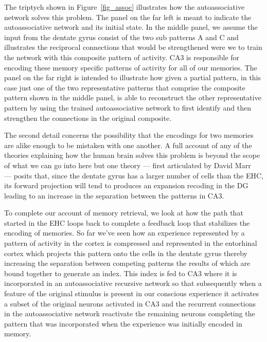 \documentclass[letterpaper,11pt]{article}
\def\urlh#1{{}}
\def\emdash{---}
\begin{document}

The triptych shown in Figure~{\urlh{#fig_Hippocampus_Auto_Associative_Network}{\ref{fig_assoc}}} illustrates how the autoassociative network solves this problem. The panel on the far left is meant to indicate the autoassociative network and its initial state. In the middle panel, we assume the input from the dentate gyrus consist of the two sub patterns A and C and illustrates the reciprocal connections that would be strengthened were we to train the network with this composite pattern of activity. CA3 is responsible for encoding these memory specific patterns of activity for all of our memories.  The panel on the far right is intended to illustrate how given a partial pattern, in this case just one of the two representative patterns that comprise the composite pattern shown in the middle panel, is able to reconstruct the other representative pattern by using the trained autoassociative network to first identify and then strengthen the connections in the original composite.

The second detail concerns the possibility that the encodings for two memories are alike enough to be mistaken with one another. A full account of any of the theories explaining how the human brain solves this problem is beyond the scope of what we can go into here but one theory \emdash{} first articulated by David Marr~\cite{MarrandBrindleyPTRS_B-71,WillshawetalPTRS_B-15} \emdash{} posits that, since the dentate gyrus has a larger number of cells than the EHC, its forward projection will tend to produces an expansion recoding in the DG leading to an increase in the separation between the patterns in CA3.


To complete our account of memory retrieval, we look at how the path that started in the EHC loops back to complete a feedback loop that stabilizes the encoding of memories. So far we've seen how an experience represented by a pattern of activity in the cortex is compressed and represented in the entorhinal cortex which projects this pattern onto the cells in the dentate gyrus thereby increasing the separation between competing patterns the results of which are bound together to generate an index. This index is fed to CA3 where it is incorporated in an autoassociative recursive network so that subsequently when a feature of the original stimulus is present in our conscious experience it activates a subset of the original neurons activated in CA3 and the recurrent connections in the autoassociative network reactivate the remaining neurons completing the pattern that was incorporated when the experience was initially encoded in memory.
  
\end{document}
